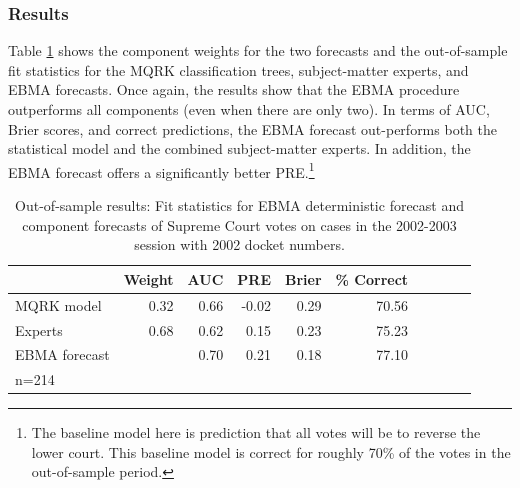 \documentclass[pdftex,12pt,fullpage,oneside]{amsart}
\begin{document}
 \subsubsection{Results}

 Table \ref{SC-Res} shows the component weights for the two forecasts
 and the out-of-sample fit statistics for the MQRK classification
 trees, subject-matter experts, and EBMA forecasts. Once again, the results
 show that the EBMA procedure outperforms all components (even when
 there are only two).  In terms of AUC, Brier scores, and correct
 predictions, the EBMA forecast out-performs both the statistical
 model and the combined subject-matter experts.  In addition, the EBMA
 forecast offers a significantly better PRE.\footnote{The baseline
   model here is prediction that all votes will be to reverse the
   lower court.  This baseline model is correct for roughly 70\% of
   the votes in the out-of-sample period.}

\begin{table}[ht]
\caption{\footnotesize Out-of-sample results: Fit statistics for EBMA deterministic
  forecast and component forecasts of Supreme Court votes on
cases in the 2002-2003 session with 2002 docket numbers.  }
\label{SC-Res} \small
\begin{center}
\begin{tabular}{l rrrrrrrrr}
  \toprule
  & Weight & AUC & PRE & Brier & \% Correct \\ 
  \midrule
  MQRK model& 0.32  & 0.66 & -0.02 & 0.29 & 70.56 \\ 
  Experts & 0.68 & 0.62 & 0.15 & 0.23 & 75.23\\ 
  EBMA forecast&  & 0.70 & 0.21 & 0.18 & 77.10\\ 
  \bottomrule
  n=214 
\end{tabular}
\end{center}
\end{table}


\end{document}
